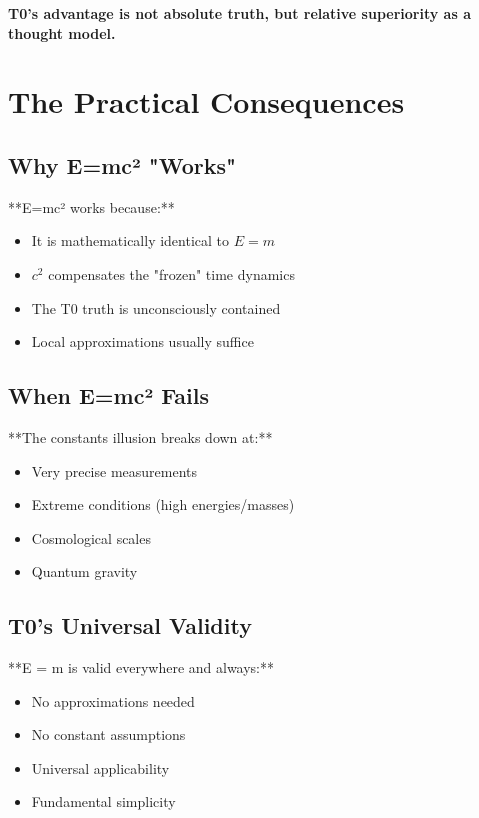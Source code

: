 \documentclass[12pt,a4paper]{article}
\begin{document}
{{{{{{{{{{{												\textbf{T0's advantage is not absolute truth, but relative superiority as a thought model.}
												
												\section{The Practical Consequences}
												
												\subsection{Why E=mc² "Works"}
												
												**E=mc² works because:**
												\begin{itemize}
													\item It is mathematically identical to $E = m$
													\item $c^2$ compensates the "frozen" time dynamics
													\item The T0 truth is unconsciously contained
													\item Local approximations usually suffice
												\end{itemize}
												
												\subsection{When E=mc² Fails}
												
												**The constants illusion breaks down at:**
												\begin{itemize}
													\item Very precise measurements
													\item Extreme conditions (high energies/masses)
													\item Cosmological scales
													\item Quantum gravity
												\end{itemize}
												
												\subsection{T0's Universal Validity}
												
												**E = m is valid everywhere and always:**
												\begin{itemize}
													\item No approximations needed
													\item No constant assumptions
													\item Universal applicability
													\item Fundamental simplicity
												\end{itemize}
												
}}}}}}}}}}}
\end{document}
